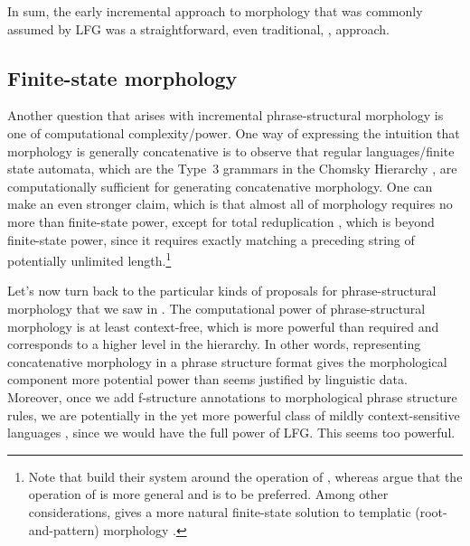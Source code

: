 \documentclass[output=paper,hidelinks]{langscibook}
\begin{document}
In sum, the early incremental approach to
morphology that was commonly assumed by LFG was a straightforward,
even traditional, , 
approach.


\subsection{Finite-state morphology}
   
\begin{sloppypar}
  Another question that arises with incremental phrase-structural
  morphology is one of computational complexity/power. One way of
  expressing the intuition that morphology is generally concatenative
  is to observe that regular languages/finite state automata, which
  are the Type~3 grammars in the Chomsky Hierarchy
  \citep[part~E]{chomsky1957syntactic,chomsky65-hier,partee-etal1990}, are
  computationally sufficient for generating concatenative
  morphology. One can make an even stronger claim, which is that  
  almost all of morphology requires no more than finite-state power,
  except for total reduplication
  \citep[25,~53--60]{beesleykarttunen03,roark;sproat07}, which is
  beyond finite-state power, since it requires exactly matching
  a preceding string of potentially unlimited length.\footnote{Note
    that \citet{beesleykarttunen03} build their system around the
    operation of , whereas \citet{roark;sproat07}
    argue that the operation of  is more general
    and is to be preferred. Among other considerations,
     gives a more natural finite-state solution to
    templatic (root-and-pattern) morphology
    \citep[41--44]{kiraz01,roark;sproat07}.}
\end{sloppypar}

\begin{sloppypar}
  Let's now turn back to the particular kinds of proposals for
  phrase-structural morphology that we saw in
  . The computational power of
  phrase-structural morphology is at least context-free, which is more
  powerful than required and corresponds to a higher level in the
  hierarchy.  In other words, representing concatenative morphology in
  a phrase structure format gives the morphological component more
  potential power than seems justified by linguistic data.
  Moreover, once we add f-structure annotations to morphological
  phrase structure rules, we are potentially in the yet more powerful
  class of mildly context-sensitive languages \citep{joshi-etal1991},
  since we would have the full power of LFG. This seems too powerful.
\end{sloppypar}
\end{document}
